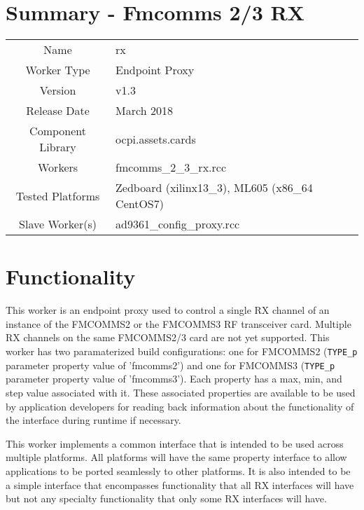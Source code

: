 \documentclass{article}
\author{} %
\date{Version \docVersion} %
\title{\docTitle}
\def\docVersion{1.3}
\def\comp{rx}
\def\Comp{Fmcomms 2/3 RX}
\begin{document}
\section*{Summary - \Comp}
\begin{tabular}{|c|M{13.5cm}|}
	\hline
	                  &                                        \\
	\hline
	Name              & \comp                                  \\
	\hline
	Worker Type       & Endpoint Proxy                         \\
	\hline
	Version           & v\docVersion \\
	\hline
	Release Date      & March 2018 \\
	\hline
	Component Library & ocpi.assets.cards \\
	\hline
	Workers           & fmcomms\_2\_3\_rx.rcc               \\
	\hline
	Tested Platforms  & Zedboard (xilinx13\_3), ML605 (x86\_64 CentOS7)                             \\
	\hline
	Slave Worker(s)   & ad9361\_config\_proxy.rcc             \\
	\hline
\end{tabular}

\section*{Functionality}

	This worker is an endpoint proxy used to control a single RX channel of an instance of the FMCOMMS2 or the FMCOMMS3 RF transceiver card. Multiple RX channels on the same FMCOMMS2/3 card are not yet supported. This worker has two paramaterized build configurations: one for FMCOMMS2 (\verb+TYPE_p+ parameter property value of 'fmcomms2') and one for FMCOMMS3 (\verb+TYPE_p+ parameter property value of 'fmcomms3'). Each property has a max, min, and step value associated with it.  These associated properties are available to be used by application developers for reading back information about the functionality of the interface during runtime if necessary.\par\medskip
	This worker implements a common interface that is intended to be used across multiple platforms.  All platforms will have the same property interface to allow applications to be ported seamlessly to other platforms.  It is also intended to be a simple interface that encompasses functionality that all RX interfaces will have but not any specialty functionality that only some RX interfaces will have.\par\medskip
\end{document}
